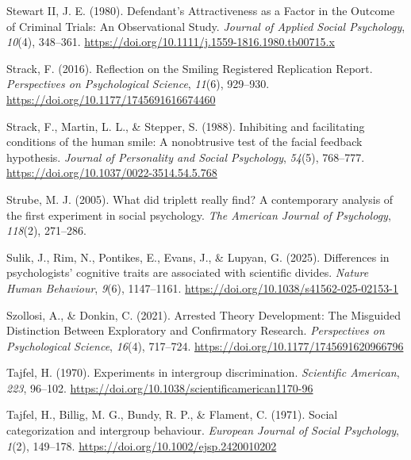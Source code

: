 \documentclass[
  letterpaper,
]{book}
\newlength{\cslhangindent}
\newenvironment{CSLReferences}[2] %
 {\begin{list}{}{%
  \setlength{\itemindent}{0pt}
  \setlength{\leftmargin}{0pt}
  \setlength{\parsep}{0pt}
  \ifodd #1
   \setlength{\leftmargin}{\cslhangindent}
   \setlength{\itemindent}{-1\cslhangindent}
  \fi
  \setlength{\itemsep}{#2\baselineskip}}}
 {\end{list}}
\begin{document}
\begin{CSLReferences}{1}{0}
Stewart II, J. E. (1980). Defendant's {Attractiveness} as a {Factor} in
the {Outcome} of {Criminal} {Trials}: {An} {Observational} {Study}.
\emph{Journal of Applied Social Psychology}, \emph{10}(4), 348--361.
\url{https://doi.org/10.1111/j.1559-1816.1980.tb00715.x}

Strack, F. (2016). Reflection on the {Smiling} {Registered}
{Replication} {Report}. \emph{Perspectives on Psychological Science},
\emph{11}(6), 929--930. \url{https://doi.org/10.1177/1745691616674460}

Strack, F., Martin, L. L., \& Stepper, S. (1988). Inhibiting and
facilitating conditions of the human smile: {A} nonobtrusive test of the
facial feedback hypothesis. \emph{Journal of Personality and Social
Psychology}, \emph{54}(5), 768--777.
\url{https://doi.org/10.1037/0022-3514.54.5.768}

Strube, M. J. (2005). What did triplett really find? A contemporary
analysis of the first experiment in social psychology. \emph{The
American Journal of Psychology}, \emph{118}(2), 271--286.

Sulik, J., Rim, N., Pontikes, E., Evans, J., \& Lupyan, G. (2025).
Differences in psychologists' cognitive traits are associated with
scientific divides. \emph{Nature Human Behaviour}, \emph{9}(6),
1147--1161. \url{https://doi.org/10.1038/s41562-025-02153-1}

Szollosi, A., \& Donkin, C. (2021). Arrested {Theory} {Development}:
{The} {Misguided} {Distinction} {Between} {Exploratory} and
{Confirmatory} {Research}. \emph{Perspectives on Psychological Science},
\emph{16}(4), 717--724. \url{https://doi.org/10.1177/1745691620966796}

Tajfel, H. (1970). Experiments in intergroup discrimination.
\emph{Scientific American}, \emph{223}, 96--102.
\url{https://doi.org/10.1038/scientificamerican1170-96}

Tajfel, H., Billig, M. G., Bundy, R. P., \& Flament, C. (1971). Social
categorization and intergroup behaviour. \emph{European Journal of
Social Psychology}, \emph{1}(2), 149--178.
\url{https://doi.org/10.1002/ejsp.2420010202}


\end{CSLReferences}
\end{document}

